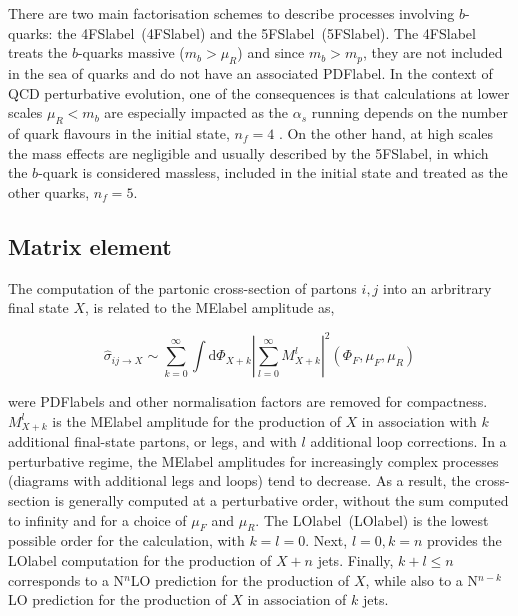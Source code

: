  There are two main factorisation schemes to describe processes involving $b$-quarks: the \acrlong{4FSlabel}~(\acrshort{4FSlabel}) and the \acrlong{5FSlabel}~(\acrshort{5FSlabel}). The \acrshort{4FSlabel} treats the $b$-quarks massive ($m_b>\mu_R$) and since $m_b>m_p$, they are not included in the sea of quarks and do not have an associated \acrshort{PDFlabel}. In the context of \acrshort{QCD} perturbative evolution, one of the consequences is that calculations at lower scales $\mu_R<m_b$ are especially impacted as the $\alpha_s$ running depends on the number of quark flavours in the initial state, $n_f=4$ . On the other hand, at high scales the mass effects are negligible and usually described by the \acrshort{5FSlabel}, in which the $b$-quark is considered massless, included in the initial state and treated as the other quarks, $n_f=5$. 

\subsection{Matrix element}

The computation of the partonic cross-section of partons $i,j$ into an arbritrary final state $X$, is related to the \acrshort{MElabel} amplitude as,

\begin{equation}
    \hat{\sigma}_{ij\to X} \sim \sum_{k=0}^{\infty} \int \text{d}\Phi_{X+k}\left|\sum_{l=0}^{\infty} M^l_{X+k}\right|^2(\Phi_F,\mu_F,\mu_R)
\end{equation}

were \acrshort{PDFlabel}s and other normalisation factors are removed for compactness. $M^l_{X+k}$ is the \acrshort{MElabel} amplitude for the production of $X$ in association with $k$ additional final-state partons, or legs, and with $l$ additional loop corrections. In a perturbative regime, the \acrshort{MElabel} amplitudes for increasingly complex processes (diagrams with additional legs and loops) tend to decrease. As a result, the cross-section is generally computed at a perturbative order, without the sum computed to infinity and for a choice of $\mu_F$ and $\mu_R$. The \acrlong{LOlabel}~(\acrshort{LOlabel}) is the lowest possible order for the calculation, with $k=l=0$. Next, $l=0,k=n$ provides the \acrshort{LOlabel} computation for the production of $X+n$ jets. Finally, $k+l\leq n$ corresponds to a N$^n$LO prediction for the production of $X$, while also to a N$^{n-k}$LO prediction for the production of $X$ in association of $k$ jets.

